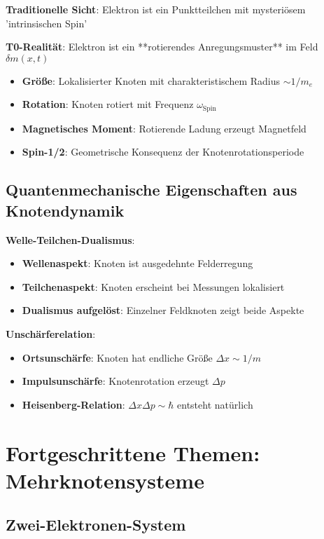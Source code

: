 \documentclass[12pt,a4paper]{article}
\newcommand{\deltam}{\delta m}
\theoremstyle{definition}
\theoremstyle{remark}
\begin{document}
	\textbf{Traditionelle Sicht}: Elektron ist ein Punktteilchen mit mysteriösem 'intrinsischen Spin'
	
	\textbf{T0-Realität}: Elektron ist ein **rotierendes Anregungsmuster** im Feld $\deltam(x,t)$
	
	\begin{itemize}
		\item \textbf{Größe}: Lokalisierter Knoten mit charakteristischem Radius $\sim 1/m_e$
		\item \textbf{Rotation}: Knoten rotiert mit Frequenz $\omega_{\text{Spin}}$
		\item \textbf{Magnetisches Moment}: Rotierende Ladung erzeugt Magnetfeld
		\item \textbf{Spin-1/2}: Geometrische Konsequenz der Knotenrotationsperiode
	\end{itemize}
	
	\subsection{Quantenmechanische Eigenschaften aus Knotendynamik}
	
	\textbf{Welle-Teilchen-Dualismus}: 
	\begin{itemize}
		\item \textbf{Wellenaspekt}: Knoten ist ausgedehnte Felderregung
		\item \textbf{Teilchenaspekt}: Knoten erscheint bei Messungen lokalisiert
		\item \textbf{Dualismus aufgelöst}: Einzelner Feldknoten zeigt beide Aspekte
	\end{itemize}
	
	\textbf{Unschärferelation}:
	\begin{itemize}
		\item \textbf{Ortsunschärfe}: Knoten hat endliche Größe $\Delta x \sim 1/m$
		\item \textbf{Impulsunschärfe}: Knotenrotation erzeugt $\Delta p$
		\item \textbf{Heisenberg-Relation}: $\Delta x \Delta p \sim \hbar$ entsteht natürlich
	\end{itemize}
	
	\section{Fortgeschrittene Themen: Mehrknotensysteme}
	
	\subsection{Zwei-Elektronen-System}
	
\end{document}
